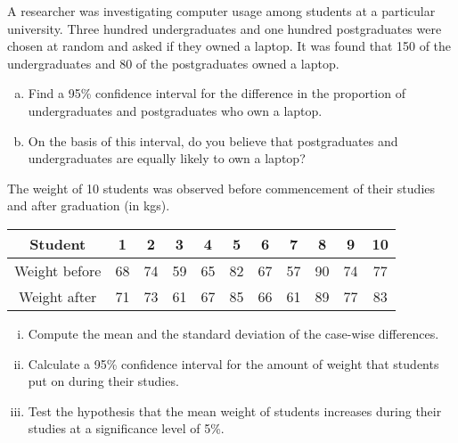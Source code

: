 

\item 

A researcher was investigating computer usage among students at a particular university. Three hundred undergraduates and one hundred postgraduates were chosen at random and asked if they owned a laptop. It was found that 150 of the undergraduates and 80 of the postgraduates owned a laptop. 
\begin{enumerate}[(a)]
\item Find a 95\% confidence interval for the difference in the proportion of undergraduates and postgraduates who own a laptop. 
\item On the basis of this interval, do you believe that postgraduates and undergraduates are equally likely to own a laptop? 
\end{enumerate}


\item 

The weight of 10 students was observed before commencement of their studies and after graduation (in kgs).

\begin{center}
\begin{tabular}{|c||c|c|c|c|c|c|c|c|c|c|} \hline 
Student &	1&	2	&3	&4	&5	&6	&7	&8	&9	&10\\ \hline 
Weight before &	68	& 74	& 59	& 65	& 82&67&57&90&74&77\\ \hline 
Weight after&71&73&61&67&85&66&61&89&77&83\\ \hline 
\end{tabular}
\end{center}


\begin{enumerate}[(i)]
\item Compute the mean and the standard deviation of the case-wise differences.
	\item  Calculate a 95\% confidence interval for the amount of weight that students put on during their studies. 
	\item   Test the hypothesis that the mean weight of students increases during their studies at a significance level of  5\%. 
\end{enumerate}


